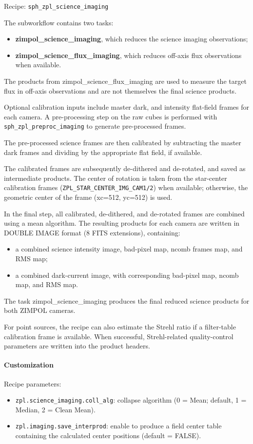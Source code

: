Recipe: \texttt{sph\_zpl\_science\_imaging}

The subworkflow contains two tasks:

\begin{itemize}
\item \textbf{zimpol\_science\_imaging}, which reduces the science imaging observations;
\item \textbf{zimpol\_science\_flux\_imaging}, which reduces off-axis flux observations when available.
\end{itemize}

The products from zimpol\_science\_flux\_imaging are used to measure the target flux in off-axis observations and are not themselves the final science products.

Optional calibration inputs include master dark, and intensity flat-field frames for each camera.
A pre-processing step on the raw cubes is performed with \texttt{sph\_zpl\_preproc\_imaging} to generate pre-processed frames.

The pre-processed science frames are then calibrated by subtracting the master dark frames
and dividing by the appropriate flat field, if available.

The calibrated frames are subsequently de-dithered and de-rotated, and saved as intermediate products.
The center of rotation is taken from the star-center calibration frames (\texttt{ZPL\_STAR\_CENTER\_IMG\_CAM1/2}) when available;
otherwise, the geometric center of the frame (xc=512, yc=512) is used.

In the final step, all calibrated, de-dithered, and de-rotated frames are combined using a mean algorithm.
The resulting products for each camera are written in DOUBLE IMAGE format (8 FITS extensions), containing:

\begin{itemize}
\item a combined science intensity image, bad-pixel map, ncomb frames map, and RMS map;
\item a combined dark-current image, with corresponding bad-pixel map, ncomb map, and RMS map.
\end{itemize}

The task zimpol\_science\_imaging produces the final reduced science products for both ZIMPOL cameras.

For point sources, the recipe can also estimate the Strehl ratio if a filter-table calibration frame is available.
When successful, Strehl-related quality-control parameters are written into the product headers.


\paragraph{Customization}

Recipe parameters:
\begin{itemize}
\item \texttt{zpl.science\_imaging.coll\_alg}: collapse algorithm (0 = Mean; default, 1 = Median, 2 = Clean Mean).
\item \texttt{zpl.imaging.save\_interprod}: enable to produce a field center table containing the calculated center positions (default = FALSE).
\end{itemize}
